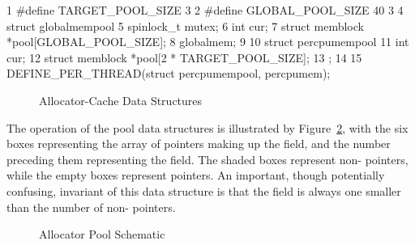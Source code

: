 { \scriptsize
\begin{verbbox}
  1 #define TARGET_POOL_SIZE 3
  2 #define GLOBAL_POOL_SIZE 40
  3
  4 struct globalmempool {
  5   spinlock_t mutex;
  6   int cur;
  7   struct memblock *pool[GLOBAL_POOL_SIZE];
  8 } globalmem;
  9
 10 struct percpumempool {
 11   int cur;
 12   struct memblock *pool[2 * TARGET_POOL_SIZE];
 13 };
 14
 15 DEFINE_PER_THREAD(struct percpumempool, percpumem);
\end{verbbox}
}
\begin{figure}[htbp]
\centering
\theverbbox
\caption{Allocator-Cache Data Structures}
\label{fig:SMPdesign:Allocator-Cache Data Structures}
\end{figure}

The operation of the pool data structures is illustrated by
Figure~\ref{fig:SMPdesign:Allocator Pool Schematic},
with the six boxes representing the array of pointers making up
the  field, and the number preceding them representing
the  field.
The shaded boxes represent non- pointers, while the empty
boxes represent  pointers.
An important, though potentially confusing, invariant of this
data structure is that the  field is always one
smaller than the number of non- pointers.

\begin{figure}[htb]
\begin{center}
\end{center}
\caption{Allocator Pool Schematic}
\label{fig:SMPdesign:Allocator Pool Schematic}
\end{figure}

